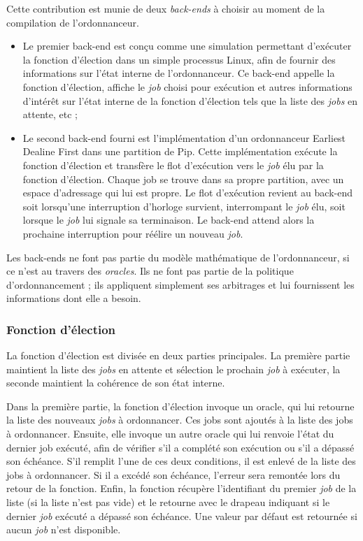 		Cette contribution est munie de deux \emph{back-ends} à choisir au moment de la compilation de l'ordonnanceur.
		\begin{itemize}
			\item Le premier back-end est conçu comme une simulation permettant d'exécuter la fonction d'élection dans un simple processus Linux, afin de fournir des informations sur l'état interne de l'ordonnanceur. Ce back-end appelle la fonction d'élection, affiche le \emph{job} choisi pour exécution et autres informations d'intérêt sur l'état interne de la fonction d'élection tels que la liste des \emph{jobs} en attente, etc ;

			\item Le second back-end fourni est l'implémentation d'un ordonnanceur Earliest Dealine First dans une partition de Pip. Cette implémentation exécute la fonction d'élection et transfère le flot d'exécution vers le \emph{job} élu par la fonction d'élection. Chaque job se trouve dans sa propre partition, avec un espace d'adressage qui lui est propre. Le flot d'exécution revient au back-end soit lorsqu'une interruption d'horloge survient, interrompant le \emph{job} élu, soit lorsque le \emph{job} lui signale sa terminaison. Le back-end attend alors la prochaine interruption pour réélire un nouveau \emph{job}.
		\end{itemize}

		Les back-ends ne font pas partie du modèle mathématique de l'ordonnanceur, si ce n'est au travers des \emph{oracles}. Ils ne font pas partie de la politique d'ordonnancement ; ils appliquent simplement ses arbitrages et lui fournissent les informations dont elle a besoin.

		\subsubsection{Fonction d'élection}

		La fonction d'élection est divisée en deux parties principales. La première partie maintient la liste des \emph{jobs} en attente et sélection le prochain \emph{job} à exécuter, la seconde maintient la cohérence de son état interne.

		Dans la première partie, la fonction d'élection invoque un oracle, qui lui retourne la liste des nouveaux \emph{jobs} à ordonnancer. Ces jobs sont ajoutés à la liste des jobs à ordonnancer. Ensuite, elle invoque un autre oracle qui lui renvoie l'état du dernier job exécuté, afin de vérifier s'il a complété son exécution ou s'il a dépassé son échéance. S'il remplit l'une de ces deux conditions, il est enlevé de la liste des jobs à ordonnancer. Si il a excédé son échéance, l'erreur sera remontée lors du retour de la fonction. Enfin, la fonction récupère l'identifiant du premier \emph{job} de la liste (si la liste n'est pas vide) et le retourne avec le drapeau indiquant si le dernier \emph{job} exécuté a dépassé son échéance. Une valeur par défaut est retournée si aucun \emph{job} n'est disponible.

